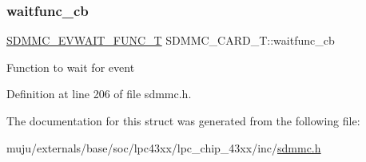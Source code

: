 \subsubsection{\texorpdfstring{waitfunc\+\_\+cb}{waitfunc\_cb}}
{\footnotesize\ttfamily \hyperlink{group___c_h_i_p___s_d_m_m_c___definitions_ga3379c3596d02e20e0531dc1287df505f}{S\+D\+M\+M\+C\+\_\+\+E\+V\+W\+A\+I\+T\+\_\+\+F\+U\+N\+C\+\_\+T} S\+D\+M\+M\+C\+\_\+\+C\+A\+R\+D\+\_\+\+T\+::waitfunc\+\_\+cb}

Function to wait for event 

Definition at line 206 of file sdmmc.\+h.



The documentation for this struct was generated from the following file\+:\begin{DoxyCompactItemize}
\item 
muju/externals/base/soc/lpc43xx/lpc\+\_\+chip\+\_\+43xx/inc/\hyperlink{sdmmc_8h}{sdmmc.\+h}\end{DoxyCompactItemize}
